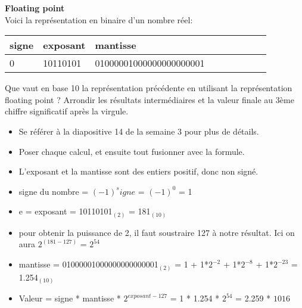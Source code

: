 \begin{Exercice}[15 minutes] \textbf{Floating point}\\
    
    Voici la représentation en binaire d'un nombre réel: \\
    
     \begin{tabular}{| p{1cm} | p{3cm} | p{9.5cm} | p{1cm} | p{1cm} | p{1cm} | p{1cm} | p{1cm} | p{1cm} |} 
            \hline
            signe & exposant & mantisse \\ [0.5ex] 
            \hline
            0 & 10110101 & 01000001000000000000001 \\ [0.5ex]
            \hline
	\end{tabular}
	
	Que vaut en base 10 la représentation précédente en utilisant la représentation floating point ? Arrondir les résultats intermédiaires et la valeur finale au 3ème chiffre significatif après la virgule. \\
	
    \begin{conseil}
    
    \begin{itemize}
    	\item Se référer à la diapositive 14 de la semaine 3 pour plus de détails.
    	\item Poser chaque calcul, et ensuite tout fusionner avec la formule.
    	\item L'exposant et la mantisse sont des entiers positif, donc non signé.
    \end{itemize}
    
    \end{conseil}
    
    \begin{solution}
        \begin{itemize}
        	\item signe du nombre = $(-1)^signe$ = $(-1)^0$ = 1
        	\item e = exposant = 10110101$_{(2)}$ = 181$_{(10)}$
        	\item pour obtenir la puissance de 2, il faut soustraire 127 à notre résultat. Ici on aura $2^{(181-127)}$ = $2^{54}$
        	\item mantisse = 01000001000000000000001$_{(2)}$ = 1 + 1*$2^{-2}$ + 1*$2^{-8}$ + 1*$2^{-23}$ = 1.254$_{(10)}$
        	\item Valeur = signe * mantisse * $2^{exposant-127}$ = 1 * 1.254 * $2^{54}$ = 2.259 * $10{16}$
        \end{itemize}
    \end{solution}
\end{Exercice}

